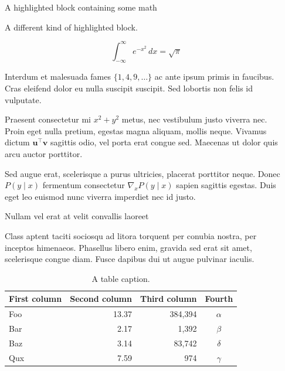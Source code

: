 \documentclass[final]{beamer}
\newlength{\sepwidth}
\newlength{\colwidth}
\newcommand{\separatorcolumn}{\begin{column}{\sepwidth}\end{column}}
\begin{document}
\begin{frame}[t]
\begin{columns}[t]
\separatorcolumn

\begin{column}{\colwidth}

  \begin{exampleblock}{A highlighted block containing some math}

    A different kind of highlighted block.

    $$
    \int_{-\infty}^{\infty} e^{-x^2}\,dx = \sqrt{\pi}
    $$

    Interdum et malesuada fames $\{1, 4, 9, \ldots\}$ ac ante ipsum primis in
    faucibus. Cras eleifend dolor eu nulla suscipit suscipit. Sed lobortis non
    felis id vulputate.


    Praesent consectetur mi $x^2 + y^2$ metus, nec vestibulum justo viverra
    nec. Proin eget nulla pretium, egestas magna aliquam, mollis neque. Vivamus
    dictum $\mathbf{u}^\intercal\mathbf{v}$ sagittis odio, vel porta erat
    congue sed. Maecenas ut dolor quis arcu auctor porttitor.


    Sed augue erat, scelerisque a purus ultricies, placerat porttitor neque.
    Donec $P(y \mid x)$ fermentum consectetur $\nabla_x P(y \mid x)$ sapien
    sagittis egestas. Duis eget leo euismod nunc viverra imperdiet nec id
    justo.

  \end{exampleblock}

  \begin{block}{Nullam vel erat at velit convallis laoreet}

    Class aptent taciti sociosqu ad litora torquent per conubia nostra, per
    inceptos himenaeos. Phasellus libero enim, gravida sed erat sit amet,
    scelerisque congue diam. Fusce dapibus dui ut augue pulvinar iaculis.

    \begin{table}
      \centering
      \begin{tabular}{l r r c}
        \toprule
        \textbf{First column} & \textbf{Second column} & \textbf{Third column} & \textbf{Fourth} \\
        \midrule
        Foo & 13.37 & 384,394 & $\alpha$ \\
        Bar & 2.17 & 1,392 & $\beta$ \\
        Baz & 3.14 & 83,742 & $\delta$ \\
        Qux & 7.59 & 974 & $\gamma$ \\
        \bottomrule
      \end{tabular}
      \caption{A table caption.}
    \end{table}


\end{block}
\end{column}
\end{columns}
\end{frame}
\end{document}
